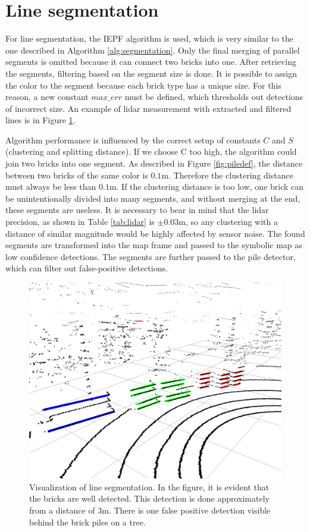 \section{Line segmentation}
For line segmentation, the IEPF algorithm is used, which is very similar to the one described in Algorithm \ref{alg:segmentation}. Only the final merging of parallel segments is omitted because it can connect two bricks into one. After retrieving the segments, filtering based on the segment size is done. It is possible to assign the color to the segment because each brick type has a unique size. For this reason, a new constant $max\_err$ must be defined, which thresholds out detections of incorrect size. An example of lidar measurement with extracted and filtered lines is in Figure \ref{fig:segments}. 

Algorithm performance is influenced by the correct setup of constants $C$ and $S$ (clustering and splitting distance). If we choose C too high, the algorithm could join two bricks into one segment. As described in Figure \ref{fig:piledef}, the distance between two bricks of the same color is $0.1$m. Therefore the clustering distance must always be less than $0.1$m. If the clustering distance is too low, one brick can be unintentionally divided into many segments, and without merging at the end, these segments are useless. It is necessary to bear in mind that the lidar precision, as shown in Table \ref{tab:lidar} is $\pm0.03$m, so any clustering with a distance of similar magnitude would be highly affected by sensor noise. The found segments are transformed into the map frame and passed to the symbolic map as low confidence detections. The segments are further passed to the pile detector, which can filter out false-positive detections.

\hspace{8mm}

\begin{figure}[H]
\centering
\includegraphics[scale=0.43]{fig/segments}
\caption[Line segmentation visualization]{Visualization of line segmentation. In the figure, it is evident that the bricks are well detected. This detection is done approximately from a distance of $3$m. There is one false positive detection visible behind the brick piles on a tree.}
\label{fig:segments}
\end{figure}


